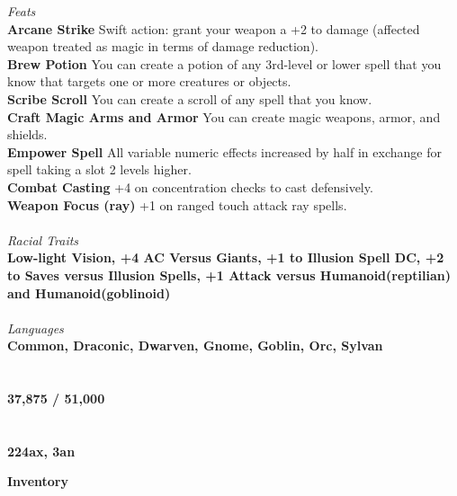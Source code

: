 \documentclass[letterpaper]{article}
\begin{document}
\noindent\emph{Feats} \\
\noindent\textbf{Arcane Strike} Swift action: grant your weapon a +2 to damage (affected weapon treated as magic in terms of damage reduction). \\
\noindent\textbf{Brew Potion} You can create a potion of any 3rd-level or lower spell that you know that targets one or more creatures or objects. \\
\noindent\textbf{Scribe Scroll} You can create a scroll of any spell that you know. \\
\noindent\textbf{Craft Magic Arms and Armor} You can create magic weapons, armor, and shields. \\
\noindent\textbf{Empower Spell} All variable numeric effects increased by half in exchange for spell taking a slot 2 levels higher. \\
\noindent\textbf{Combat Casting} +4 on concentration checks to cast defensively. \\
\noindent\textbf{Weapon Focus (ray)} +1 on ranged touch attack ray spells. \\
\\
\noindent\emph{Racial Traits} \\
\textbf{Low-light Vision, +4 AC Versus Giants, +1 to Illusion Spell DC, +2 to Saves versus Illusion Spells, +1 Attack versus Humanoid(reptilian) and Humanoid(goblinoid)} \\
\\
\noindent\emph{Languages} \\
\textbf{Common, Draconic, Dwarven, Gnome, Goblin, Orc, Sylvan} \\
\\
 \\
\textbf{37,875 / 51,000} \\
\\
 \\
\textbf{224ax, 3an} \\

\pagebreak

\noindent \textbf{\huge{Inventory}} \\
\end{document}
